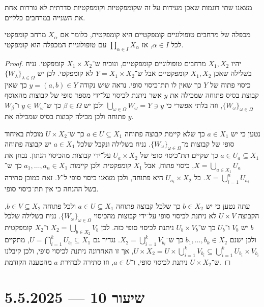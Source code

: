 מצאנו שתי דוגמות שאכן מעידות על זה שקומפקטיות וקומפקטיות סדרתית לא גוררות אחת את השנייה במרחבים כלליים.
\begin{theorem}
	מכפלה של מרחבים טופולוגיים קומפקטיים היא קומפקטית,
	כלומר אם $X_{\alpha}$ מרחב קומפקטי לכל $\alpha \in I$, אז $\prod_{\alpha \in I} X_{\alpha}$ עם טופולוגיית המכפלה הוא קומפקטי.
\end{theorem}
\begin{proof}
	יהיו $X_1, X_2$ מרחבים טופולוגיים קומפקטיים, ונוכיח ש־$X_1 \times X_2$ קומפקטי.
	נניח בשלילה שאכן $X_1, X_2$ קומפקטיים אבל ש־$Y = X_1 \times X_2$ לא קומפקטי.
	לכן יש ${\{ W_{\lambda}\}}_{\lambda \in \Omega}$ כיסוי פתוח של $Y$ כך שאין לו תת־כיסוי סופי.
	נראה שיש נקודה $y = (a, b) \in Y$ כך שאין קבוצת בסיס פתוחה שמכילה את $y$ אשר ניתנת לכיסוי על־ידי מספר סופי של קבוצות מהאוסף ${\{ W_{\omega} \}}_{\omega \in \Omega}$,
	וזה בלתי אפשרי כי $\bigcup_{\omega \in \Omega} W_{\omega} = Y \ni y$ ולכן יש $\beta \in \Omega$ כך ש־$y \in W_{\omega}$ ו־$W_{\beta}$ פתוחה ולכן מכילה קבוצת בסיס שמכילה את $y$.

	נטען כי יש $a \in X_1$ כך שלא קיימת קבוצה פתוחה $a \in U \subseteq X_1$ כך ש־$U \times X_2$ מוכלת באיחוד סופי של קבוצות מ־${\{ W_{\omega} \}}_{\omega \in \Omega}$.
	נניח בשלילה ונקבל שלכל $a \in X_1$ יש קבוצה פתוחה $a \in U_a \subseteq X_1$ כך שקיים תת־כיסוי סופי של $U_a \times X_2$ על־ידי קבוצות מהכיסוי הנתון.
	נבחן את $X = \bigcup_{a \in X_1} U_a$, כיסוי פתוח, אבל $X_1$ קומפקטית ולכן קיימות $a_1, \ldots, a_n \in X_1$ כך ש־$X = \bigcup_{i = 1}^n U_{a_i}$.
	כל $U_{a_i} \times X_2$ היא פתוחה, ולכן מצאנו כיסוי סופי ל־$Y$.
	זאת כמובן סתירה בשל ההנחה כי אין תת־כיסוי סופי.

	עתה נטען כי יש $b \in X_2$ כך שלכל קבוצה פתוחה $a \in U \subseteq X_1$ ולכל פתוחה $b \in V \subseteq X_2$,
	הקבוצה $U \times V$ לא ניתנת לכיסוי סופי על־ידי קבוצות מהכיסוי ${\{ W_{\omega} \}}_{\omega \in \Omega}$.
	נניח בשלילה שלכל $b$ יש $V_b$ ו־$U_b$ כך ש־$U_b \times V_b$ ניתנת לכיסוי סופי כזה.
	לכן $X_2 = \bigcup_{b \in X_2} V_b$ ו־$X_2$ קומפקטית ולכן ישנם $b_1, \ldots, b_k \in X_2$ כך ש־$X_2 = \bigcup_{i = 1}^k V_{b_i}$.
	נגדיר גם $U = \bigcap_{i = 1}^k U_{b_i} \subseteq X_1$, מתקיים $U \times X_2 = U \times \bigcup_{i = 1}^k V_{b_i} \subseteq \bigcup_{i = 1}^k U_{b_i} \times  V_{b_i}$,
	אך זו האחרונה ניתנת לכיסוי סופי, ולכן קיבלנו ש־$U \times X_2$ ניתנת לכיסוי סופי, ו־$a \in U$, וזו סתירה לבחירת $a$ מהטענה הקודמת.
\end{proof}

\section{שיעור 10 --- 5.5.2025}
